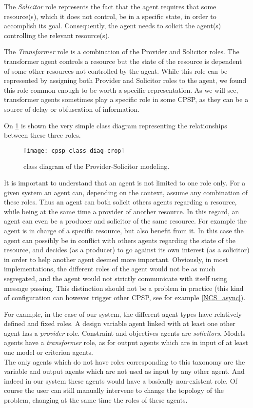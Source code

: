 The \emph{Solicitor} role represents the fact that the agent requires that some resource(s), which it does not control, be in a specific state, in order to accomplish its goal. Consequently, the agent needs to solicit the agent(s) controlling the relevant resource(s).

The \emph{Transformer} role is a combination of the Provider and Solicitor roles. The transformer agent controls a resource but the state of the resource is dependent of some other resources not controlled by the agent. While this role can be represented by assigning both Provider and Solicitor roles to the agent, we found this role common enough to be worth a specific representation. As we will see, transformer agents sometimes play a specific role in some CPSP, as they can be a source of delay or obfuscation of information.

On \figurename{} \ref{cpsp_class_diag} is shown the very simple class diagram representing the relationships between these three roles.

\begin{figure}
\centering
\texttt{[image: cpsp\_class\_diag-crop]}
\caption{class diagram of the Provider-Solicitor modeling.}
\label{cpsp_class_diag}
\end{figure}

It is important to understand that an agent is not limited to one role only. For a given system an agent can, depending on the context, assume any combination of these roles. Thus an agent can both solicit others agents regarding a resource, while being  at the same time a provider of another resource.
In this regard, an agent can even be a producer and solicitor of the same resource. For example the agent is in charge of a specific resource, but also benefit from it. In this case the agent can possibly be in conflict with others agents regarding the state of the resource, and decides (as a producer) to go against its own interest (as a solicitor) in order to help another agent deemed more important.
Obviously, in most implementations, the different roles of the agent would not be as much segregated, and the agent would not strictly communicate with itself using message passing. This distinction should not be a problem in practice (this kind of configuration can however trigger other CPSP, see for example \ref{NCS_async}).

For example, in the case of our system, the different agent types have relatively defined and fixed roles. A design variable agent linked with at least one other agent has a \emph{provider} role. Constraint and objectives agents are \emph{solicitors}. Models agents have a \emph{transformer} role, as for output agents which are in input of at least one model or criterion agents.\\
The only agents which do not have roles corresponding to this taxonomy are the variable and output agents which are not used as input by any other agent. And indeed in our system these agents would have a basically non-existent role. Of course the user can still manually intervene to change the topology of the problem, changing at the same time the roles of these agents.


